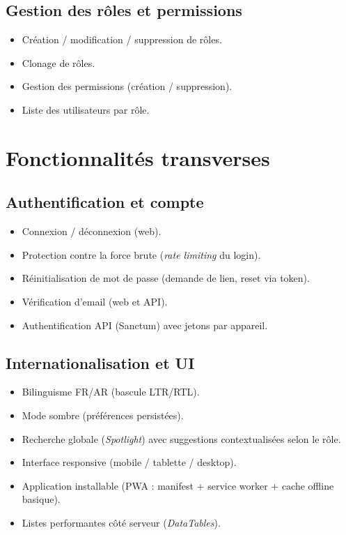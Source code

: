 \documentclass[12pt, a4paper]{article}
\begin{document}
\subsection{Gestion des rôles et permissions}
\begin{itemize}
    \item Création / modification / suppression de rôles.
    \item Clonage de rôles.
    \item Gestion des permissions (création / suppression).
    \item Liste des utilisateurs par rôle.
\end{itemize}

\section{Fonctionnalités transverses}
\subsection{Authentification et compte}
\begin{itemize}
    \item Connexion / déconnexion (web).
    \item Protection contre la force brute (\textit{rate limiting} du login).
    \item Réinitialisation de mot de passe (demande de lien, reset via token).
    \item Vérification d'email (web et API).
    \item Authentification API (Sanctum) avec jetons par appareil.
\end{itemize}

\subsection{Internationalisation et UI}
\begin{itemize}
    \item Bilinguisme FR/AR (bascule LTR/RTL).
    \item Mode sombre (préférences persistées).
    \item Recherche globale (\textit{Spotlight}) avec suggestions contextualisées selon le rôle.
    \item Interface responsive (mobile / tablette / desktop).
    \item Application installable (PWA : manifest + service worker + cache offline basique).
    \item Listes performantes côté serveur (\textit{DataTables}).
\end{itemize}
\end{document}
